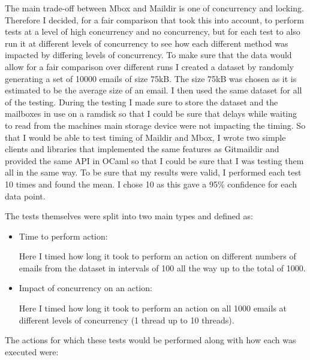 The main trade-off between Mbox and Maildir is one of concurrency and locking. Therefore I decided, for a fair comparison that took this into account, to perform tests at a level of high concurrency and no concurrency, but for each test to also run it at different levels of concurrency to see how each different method was impacted by differing levels of concurrency. To make sure that the data would allow for a fair comparison over different runs I created a dataset by randomly generating a set of 10000 emails of size 75kB. The size 75kB was chosen as it is estimated to be the average size of an email\cite{email_size}. I then used the same dataset for all of the testing. During the testing I made sure to store the dataset and the mailboxes in use on a ramdisk so that I could be sure that delays while waiting to read from the machines main storage device were not impacting the timing. So that I would be able to test timing of Maildir and Mbox, I wrote two simple clients and libraries that implemented the same features as Gitmaildir and provided the same API in OCaml so that I could be sure that I was testing them all in the same way. To be sure that my results were valid, I performed each test 10 times and found the mean. I chose 10 as this gave a 95\% confidence for each data point.

The tests themselves were split into two main types and defined as:

\begin{itemize}
\item Time to perform action:

  Here I timed how long it took to perform an action on different numbers of emails from the dataset in intervals of 100 all the way up to the total of 1000.

\item Impact of concurrency on an action:

  Here I timed how long it took to perform an action on all 1000 emails at different levels of concurrency (1 thread up to 10 threads).
  
\end{itemize}

The actions for which these tests would be performed along with how each was executed were:

